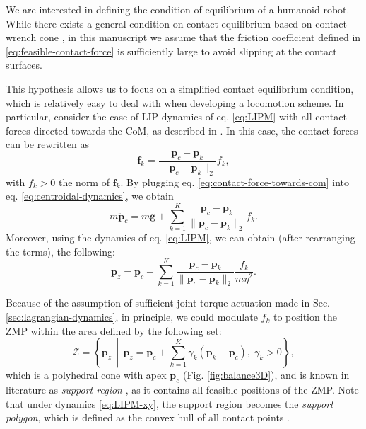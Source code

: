 We are interested in defining the condition of equilibrium of a humanoid robot.
While there exists a general condition on contact
equilibrium based on contact wrench cone \cite{Caron2015RSS}, in this manuscript
we assume that the friction coefficient defined in
\eqref{eq:feasible-contact-force} is sufficiently large to avoid slipping at the
contact surfaces.

This hypothesis allows us to focus on a simplified contact equilibrium
condition, which is relatively easy to deal with when developing a locomotion
scheme. In particular, consider the case of LIP dynamics of eq. \eqref{eq:LIPM}
with all contact forces directed towards the CoM, as described in
\cite{Sugihara2002ICRA}.
In this case, the contact forces can be rewritten as
\begin{equation}
    \label{eq:contact-force-towards-com}
    \bm{f}_k = \frac{\bm{p}_c - \bm{p}_k}{\| \bm{p}_c - \bm{p}_k \|_2} f_k,
\end{equation}
with $f_k>0$ the norm of $\bm{f}_k$. By plugging eq.
\eqref{eq:contact-force-towards-com} into eq.
\eqref{eq:centroidal-dynamics}, we obtain
\begin{equation}
    m \ddot{\bm{p}}_c = m \bm{g} + \sum_{k=1}^K \frac{\bm{p}_c - \bm{p}_k}{\| \bm{p}_c - \bm{p}_k \|_2} f_k.
\end{equation}
Moreover, using the dynamics of eq. \eqref{eq:LIPM}, we can
obtain (after rearranging the terms), the following:
\begin{equation*}
    \bm{p}_z = \bm{p}_c - \sum_{k=1}^K \frac{\bm{p}_c - \bm{p}_k}{\| \bm{p}_c - \bm{p}_k \|_2} \frac{f_k}{m \eta^2}.
\end{equation*}

Because of the assumption of sufficient joint torque actuation made in Sec.
\ref{sec:lagrangian-dynamics}, in principle, we could modulate $f_k$ to position
the ZMP within the area defined by the following set:
\begin{equation}
    \mathcal{Z} = \left\{ \bm{p}_z \,\middle\vert\, \bm{p}_z = \bm{p}_c + \sum_{k=1}^K \gamma_k (\bm{p}_k - \bm{p}_c), \; \gamma_k > 0  \right\},
    \label{eq:ZMP-polyhedral-cone}
\end{equation}
which is a polyhedral cone with apex $\bm{p}_c$ (Fig. \ref{fig:balance3D}), and
is known in literature as \textit{support region} \cite{Sugihara2021ICRA},
as it contains all feasible positions of the ZMP. Note that under dynamics
\eqref{eq:LIPM-xy}, the support region becomes the \textit{support
polygon}, which is defined as the convex hull of all contact points
\cite{SardainBessonnet2004}.

